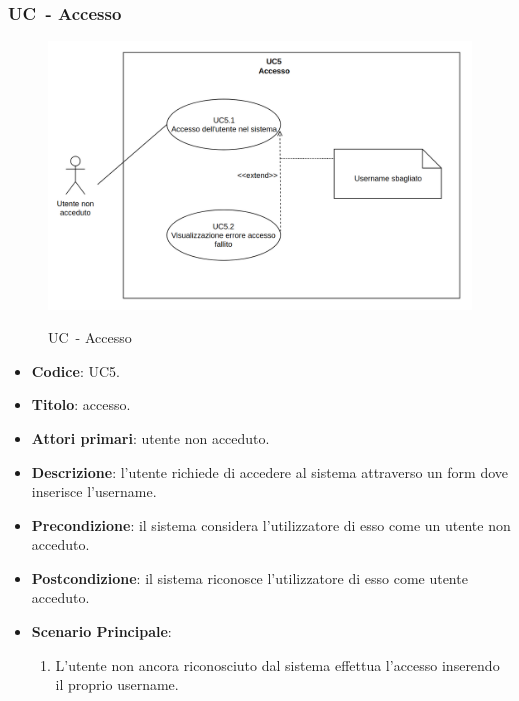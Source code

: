 
\subsubsection{UC\theuccount\ - Accesso}
		\begin{figure}[H]
			\centering
				\includegraphics[width=\columnwidth]{img/UC5.png}\\
			\caption{UC\theuccount\ - Accesso}
		\end{figure}
	\begin{itemize}
		\item \textbf{Codice}: UC5.
		\item \textbf{Titolo}: accesso.
		\item \textbf{Attori primari}: utente non acceduto.
		\item \textbf{Descrizione}: l'utente richiede di accedere al sistema attraverso un form dove inserisce l'username.
		\item \textbf{Precondizione}: il sistema considera l’utilizzatore di esso come un utente non acceduto.
		\item \textbf{Postcondizione}: il sistema riconosce l'utilizzatore di esso come utente acceduto.
		\item \textbf{Scenario Principale}:
		\begin{enumerate}
			\item L'utente non ancora riconosciuto dal sistema effettua l'accesso inserendo il proprio username.
		\end{enumerate}
	\end{itemize}
	
